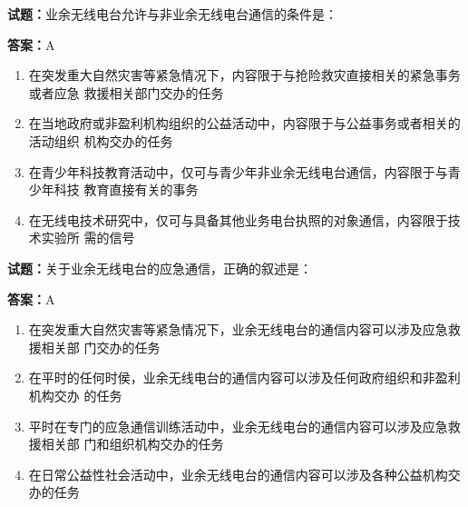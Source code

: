 \documentclass{ctexbook}
\begin{document}




\vspace{1em}

\textbf{试题：}业余无线电台允许与非业余无线电台通信的条件是： 

\textbf{答案：}A 

\begin{enumerate}[leftmargin=3em]
  \item 在突发重大自然灾害等紧急情况下，内容限于与抢险救灾直接相关的紧急事务或者应急
救援相关部门交办的任务 

  \item 在当地政府或非盈利机构组织的公益活动中，内容限于与公益事务或者相关的活动组织
机构交办的任务 

  \item 在青少年科技教育活动中，仅可与青少年非业余无线电台通信，内容限于与青少年科技
教育直接有关的事务 

  \item 在无线电技术研究中，仅可与具备其他业务电台执照的对象通信，内容限于技术实验所
需的信号 

\end{enumerate}





\vspace{1em}

\textbf{试题：}关于业余无线电台的应急通信，正确的叙述是： 

\textbf{答案：}A 

\begin{enumerate}[leftmargin=3em]
  \item 在突发重大自然灾害等紧急情况下，业余无线电台的通信内容可以涉及应急救援相关部
门交办的任务 

  \item 在平时的任何时侯，业余无线电台的通信内容可以涉及任何政府组织和非盈利机构交办
的任务 

  \item 平时在专门的应急通信训练活动中，业余无线电台的通信内容可以涉及应急救援相关部
门和组织机构交办的任务 

  \item 在日常公益性社会活动中，业余无线电台的通信内容可以涉及各种公益机构交办的任务 

\end{enumerate}
\end{document}

